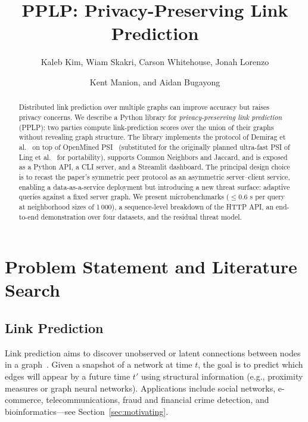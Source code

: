 \documentclass[sigconf]{acmart}
\begin{document}
\title{PPLP: Privacy-Preserving Link Prediction}

\author{Kaleb Kim, Wiam Skakri, Carson Whitehouse, Jonah Lorenzo}
\author{Kent Manion, and Aidan Bugayong}
\renewcommand{\shortauthors}{Kim et al.}

\begin{abstract}
Distributed link prediction over multiple graphs can improve accuracy but raises privacy concerns. We describe a Python library for \emph{privacy-preserving link prediction} (PPLP): two parties compute link-prediction scores over the union of their graphs without revealing graph structure. The library implements the protocol of Demirag et al.~\cite{Demirag2022} on top of OpenMined PSI~\cite{openminedpsi} (substituted for the originally planned ultra-fast PSI of Ling et al.~\cite{ling2025ultrafast} for portability), supports Common Neighbors and Jaccard, and is exposed as a Python API, a CLI server, and a Streamlit dashboard. The principal design choice is to recast the paper's symmetric peer protocol as an asymmetric server--client service, enabling a data-as-a-service deployment but introducing a new threat surface: adaptive queries against a fixed server graph. We present microbenchmarks ($\le 0.6$ s per query at neighborhood sizes of 1\,000), a sequence-level breakdown of the HTTP API, an end-to-end demonstration over four datasets, and the residual threat model.
\end{abstract}


\maketitle

\section{Problem Statement and Literature Search}

\subsection{Link Prediction}
Link prediction aims to discover unobserved or latent connections between nodes in a graph~\cite{liben-nowell2007link}. Given a snapshot of a network at time $t$, the goal is to predict which edges will appear by a future time $t'$ using structural information (e.g., proximity measures or graph neural networks). Applications include social networks, e-commerce, telecommunications, fraud and financial crime detection, and bioinformatics---see Section~\ref{sec:motivating}.
\end{document}
